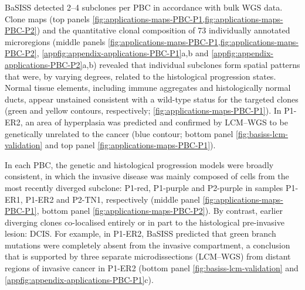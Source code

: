\ac{BaSISS} detected 2–4 subclones per \ac{PBC} in accordance with bulk \ac{WGS} data. Clone maps (top panels \cref{fig:applications-maps-PBC-P1,fig:applications-maps-PBC-P2}) and the quantitative clonal composition of 73 individually annotated microregions (middle panels \cref{fig:applications-maps-PBC-P1,fig:applications-maps-PBC-P2}, \cref{appfig:appendix-applications-PBC-P1}a,b and \cref{appfig:appendix-applications-PBC-P2}a,b) revealed that individual subclones form spatial patterns that were, by varying degrees, related to the histological progression states. Normal tissue elements, including immune aggregates and histologically normal ducts, appear unstained consistent with a wild-type status for the targeted clones (green and yellow contours, respectively; \cref{fig:applications-maps-PBC-P1}). In P1-ER2, an area of hyperplasia was predicted and confirmed by \ac{LCM}–\ac{WGS} to be genetically unrelated to the cancer (blue contour; bottom panel \cref{fig:basiss-lcm-validation} and top panel \cref{fig:applications-maps-PBC-P1}).

In each \ac{PBC}, the genetic and histological progression models were broadly consistent, in which the invasive disease was mainly composed of cells from the most recently diverged subclone: P1-red, P1-purple and P2-purple in samples P1-ER1, P1-ER2 and P2-TN1, respectively (middle panel \cref{fig:applications-maps-PBC-P1}, bottom panel \cref{fig:applications-maps-PBC-P2}). By contrast, earlier diverging clones co-localised entirely or in part to the histological pre-invasive lesion: \ac{DCIS}. For example, in P1-ER2, \ac{BaSISS} predicted that green branch mutations were completely absent from the invasive compartment, a conclusion that is supported by three separate microdissections (\ac{LCM}–\ac{WGS}) from distant regions of invasive cancer in P1-ER2 (bottom panel \cref{fig:basiss-lcm-validation} and \cref{appfig:appendix-applications-PBC-P1}c).

